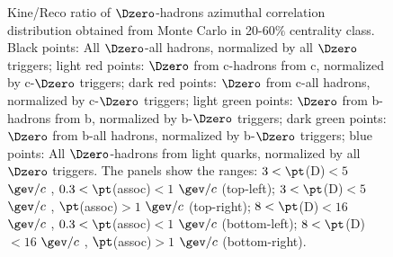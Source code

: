 \begin{figure}
\caption{Kine/Reco ratio of $\Dzero$-hadrons azimuthal correlation distribution obtained from Monte Carlo in 20-60$\%$ centrality class. Black points: All $\Dzero$-all hadrons, normalized by all $\Dzero$ triggers; light red points: $\Dzero$ from c-hadrons from c, normalized by c-$\Dzero$ triggers; dark red points: $\Dzero$ from c-all hadrons, normalized by c-$\Dzero$ triggers; light green points: $\Dzero$ from b-hadrons from b, normalized by b-$\Dzero$ triggers; dark green points: $\Dzero$ from b-all hadrons, normalized by b-$\Dzero$ triggers; blue points: All $\Dzero$-hadrons from light quarks, normalized by all $\Dzero$ triggers.
The panels show the ranges: $3 < \pt$(D)$ < 5$ $\gev/c$ , $0.3 < \pt$(assoc)$ < 1$ $\gev/c$  (top-left); $3 < \pt$(D)$ < 5$ $\gev/c$ , $\pt$(assoc)$ > 1$ $\gev/c$  (top-right); $8 < \pt$(D)$ < 16$ $\gev/c$ , $0.3 < \pt$(assoc)$ < 1$ $\gev/c$  (bottom-left); $8 < \pt$(D)$ < 16$ $\gev/c$ , $\pt$(assoc)$ > 1$ $\gev/c$  (bottom-right).}
\label{fig:MC_Kine_2060}
\end{figure}

